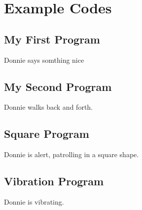 \section{Example Codes}
\label{sec:godonnie_codes}


\subsection{My First Program}

Donnie says somthing nice

\subsection{My Second Program}

Donnie walks back and forth.

\subsection{Square Program}

Donnie is alert, patrolling in a square shape.

\subsection{Vibration Program}

Donnie is vibrating.
